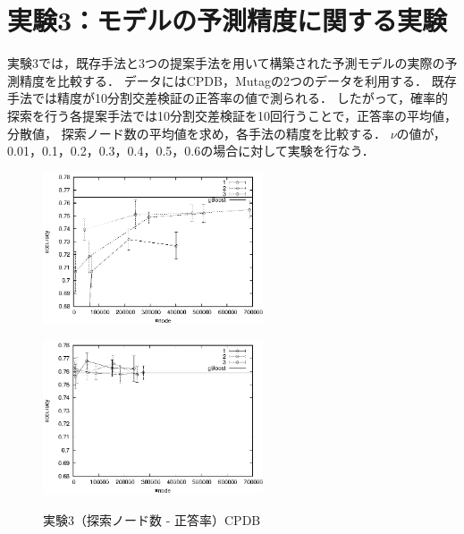 \section{実験3：モデルの予測精度に関する実験}
実験3では，既存手法と3つの提案手法を用いて構築された予測モデルの実際の予測精度を比較する．
データにはCPDB，Mutagの2つのデータを利用する．
既存手法では精度が10分割交差検証の正答率の値で測られる．
したがって，確率的探索を行う各提案手法では10分割交差検証を10回行うことで，正答率の平均値，分散値，
探索ノード数の平均値を求め，各手法の精度を比較する．
$\nu$の値が，0.01，0.1，0.2，0.3，0.4，0.5，0.6の場合に対して実験を行なう．
\begin{figure}[t]
	\begin{minipage}{0.5\hsize}
		\begin{center}
			\includegraphics[width=65mm]{cpdb/node_acc.eps}
		\end{center}
		\vspace{0.5cm}
		\label{fig:10}
	\end{minipage}
	\begin{minipage}{0.5\hsize}
		\begin{center}
			\includegraphics[width=65mm]{cpdb/node_acc_para.eps}
		\end{center}
		\vspace{0.5cm}
		\label{fig:11}
	\end{minipage}
	\caption{実験3（探索ノード数 - 正答率）CPDB}
	\label{cpdb_acc}
\end{figure}
